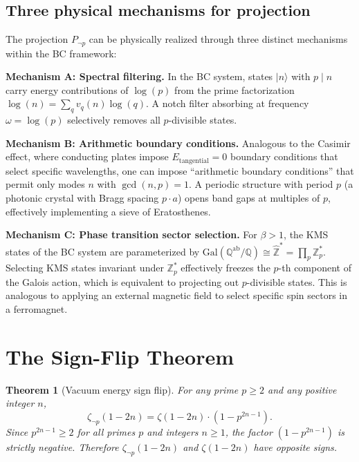 \documentclass[aps,prd,twocolumn,superscriptaddress,nofootinbib]{revtex4-2}
\newtheorem{theorem}{Theorem}
\newcommand{\Gal}{\mathrm{Gal}}
\newcommand{\Zhat}{\hat{\mathbb{Z}}}
\begin{document}
\subsection{Three physical mechanisms for projection}

The projection $P_{\neg p}$ can be physically realized through
three distinct mechanisms within the BC framework:

\textbf{Mechanism A: Spectral filtering.}
In the BC system, states $|n\rangle$ with $p \mid n$ carry
energy contributions of $\log(p)$ from the prime factorization
$\log(n) = \sum_q v_q(n)\log(q)$.
A notch filter absorbing at frequency $\omega = \log(p)$
selectively removes all $p$-divisible states.

\textbf{Mechanism B: Arithmetic boundary conditions.}
Analogous to the Casimir effect, where conducting plates impose
$E_{\mathrm{tangential}} = 0$ boundary conditions that select
specific wavelengths, one can impose ``arithmetic boundary
conditions'' that permit only modes $n$ with $\gcd(n,p) = 1$.
A periodic structure with period $p$ (a photonic crystal with
Bragg spacing $p \cdot a$) opens band gaps at multiples of $p$,
effectively implementing a sieve of Eratosthenes.

\textbf{Mechanism C: Phase transition sector selection.}
For $\beta > 1$, the KMS states of the BC system are
parameterized by $\Gal(\mathbb{Q}^{\mathrm{ab}}/\mathbb{Q}) \cong \Zhat^* = \prod_p \mathbb{Z}_p^*$.
Selecting KMS states invariant under $\mathbb{Z}_p^*$
effectively freezes the $p$-th component of the Galois action,
which is equivalent to projecting out $p$-divisible states.
This is analogous to applying an external magnetic field
to select specific spin sectors in a ferromagnet.

\section{The Sign-Flip Theorem}
\label{sec:sign_flip}

\begin{theorem}[Vacuum energy sign flip]
\label{thm:sign_flip}
For any prime $p \geq 2$ and any positive integer $n$,
\begin{equation}
  \zeta_{\neg p}(1-2n) = \zeta(1-2n) \cdot (1 - p^{2n-1}).
  \label{eq:sign_flip}
\end{equation}
Since $p^{2n-1} \geq 2$ for all primes $p$ and integers $n \geq 1$,
the factor $(1 - p^{2n-1})$ is strictly negative.
Therefore $\zeta_{\neg p}(1-2n)$ and $\zeta(1-2n)$ have
\emph{opposite signs}.
\end{theorem}
\end{document}
